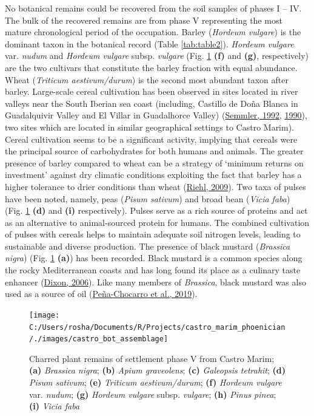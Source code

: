 \documentclass[3p]{elsarticle} %
\begin{document}
No botanical remains could be recovered from the soil samples of phases I -- IV. The bulk of the recovered remains are from phase V representing the most mature chronological period of the occupation. Barley (\emph{Hordeum vulgare}) is the dominant taxon in the botanical record (Table \ref{tab:table2}). \emph{Hordeum vulgare} var. \emph{nudum} and \emph{Hordeum vulgare} subsp. \emph{vulgare} (Fig. \ref{fig:castro-archbot-assemblage} \textbf{(f)} and \textbf{(g)}, respectively) are the two cultivars that constitute the barley fraction with equal abundance. Wheat (\emph{Triticum aestivum/durum}) is the second most abundant taxon after barley. Large-scale cereal cultivation has been observed in sites located in river valleys near the South Iberian sea coast (including, Castillo de Doña Blanca in Guadalquivir Valley and El Villar in Guadalhorce Valley) (\protect\hyperlink{ref-semmler92}{Semmler, 1992}, \protect\hyperlink{ref-semmler90}{1990}), two sites which are located in similar geographical settings to Castro Marim). Cereal cultivation seems to be a significant activity, implying that cereals were the principal source of carbohydrates for both humans and animals. The greater presence of barley compared to wheat can be a strategy of `minimum returns on investment' against dry climatic conditions exploiting the fact that barley has a higher tolerance to drier conditions than wheat (\protect\hyperlink{ref-riehl09}{Riehl, 2009}). Two taxa of pulses have been noted, namely, peas (\emph{Pisum sativum}) and broad bean (\emph{Vicia faba}) (Fig. \ref{fig:castro-archbot-assemblage} \textbf{(d)} and \textbf{(i)} respectively). Pulses serve as a rich source of proteins and act as an alternative to animal-sourced protein for humans. The combined cultivation of pulses with cereals helps to maintain adequate soil nitrogen levels, leading to sustainable and diverse production. The presence of black mustard (\emph{Brassica nigra}) (Fig. \ref{fig:castro-archbot-assemblage} \textbf{(a)}) has been recorded. Black mustard is a common species along the rocky Mediterranean coasts and has long found its place as a culinary taste enhancer (\protect\hyperlink{ref-dixon06}{Dixon, 2006}). Like many members of \emph{Brassica}, black mustard was also used as a source of oil (\protect\hyperlink{ref-pena-chocarro_etal19}{Peña-Chocarro et al., 2019}).



\begin{figure}
\texttt{[image: C:/Users/rosha/Documents/R/Projects/castro\_marim\_phoenician/./images/castro\_bot\_assemblage]} \caption{Charred plant remains of settlement phase V from Castro Marim; \textbf{(a)} \emph{Brassica nigra}; \textbf{(b)} \emph{Apium graveolens}; \textbf{(c)} \emph{Galeopsis tetrahit}; \textbf{(d)} \emph{Pisum sativum}; \textbf{(e)} \emph{Triticum aestivum/durum}; \textbf{(f)} \emph{Hordeum vulgare} var. \emph{nudum}; \textbf{(g)} \emph{Hordeum vulgare} subsp. \emph{vulgare}; \textbf{(h)} \emph{Pinus pinea}; \textbf{(i)} \emph{Vicia faba}}\label{fig:castro-archbot-assemblage}
\end{figure}
\end{document}
